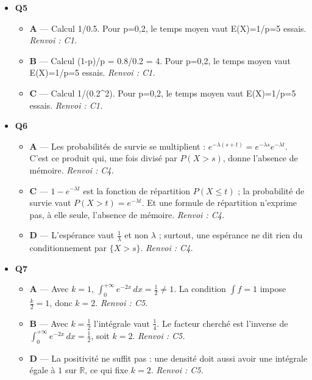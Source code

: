 \begin{itemize}
\begin{itemize}
    \item \textbf{B} — Formule fausse. L'événement X>k signifie k échecs successifs, donc P(X>k)=(1-p)\textasciicircum{}k. \emph{Renvoi : C2.}
    \item \textbf{D} — Probabilité P(X <= k). L'événement X>k signifie k échecs successifs, donc P(X>k)=(1-p)\textasciicircum{}k. \emph{Renvoi : C2.}
  \end{itemize}
  \item \textbf{Q5}
  \begin{itemize}
    \item \textbf{A} — Calcul 1/0.5. Pour p=0,2, le temps moyen vaut E(X)=1/p=5 essais. \emph{Renvoi : C1.}
    \item \textbf{B} — Calcul (1-p)/p = 0.8/0.2 = 4. Pour p=0,2, le temps moyen vaut E(X)=1/p=5 essais. \emph{Renvoi : C1.}
    \item \textbf{C} — Calcul 1/(0.2\textasciicircum{}2). Pour p=0,2, le temps moyen vaut E(X)=1/p=5 essais. \emph{Renvoi : C1.}
  \end{itemize}
  \item \textbf{Q6}
  \begin{itemize}
    \item \textbf{A} — Les probabilités de survie se multiplient : $e^{-\lambda(s+t)}=e^{-\lambda s}e^{-\lambda t}$. C'est ce produit qui, une fois divisé par $P(X>s)$, donne l'absence de mémoire. \emph{Renvoi : C4.}
    \item \textbf{C} — $1-e^{-\lambda t}$ est la fonction de répartition $P(X\leq t)$ ; la probabilité de survie vaut $P(X>t)=e^{-\lambda t}$. Et une formule de répartition n'exprime pas, à elle seule, l'absence de mémoire. \emph{Renvoi : C4.}
    \item \textbf{D} — L'espérance vaut $\tfrac1\lambda$ et non $\lambda$ ; surtout, une espérance ne dit rien du conditionnement par $\{X>s\}$. \emph{Renvoi : C4.}
  \end{itemize}
  \item \textbf{Q7}
  \begin{itemize}
    \item \textbf{A} — Avec $k=1$, $\int_0^{+\infty}e^{-2x}\,dx=\tfrac12\neq1$. La condition $\int f=1$ impose $\tfrac k2=1$, donc $k=2$. \emph{Renvoi : C5.}
    \item \textbf{B} — Avec $k=\tfrac12$ l'intégrale vaut $\tfrac14$. Le facteur cherché est l'inverse de $\int_0^{+\infty}e^{-2x}\,dx=\tfrac12$, soit $k=2$. \emph{Renvoi : C5.}
    \item \textbf{D} — La positivité ne suffit pas : une densité doit aussi avoir une intégrale égale à $1$ sur $\mathbb{R}$, ce qui fixe $k=2$. \emph{Renvoi : C5.}

\end{itemize}
\end{itemize}
